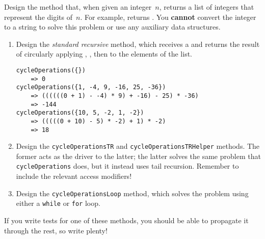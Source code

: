 Design the  method that, when given an integer~$n$, returns a list of integers that represent the digits of~$n$. For example,  returns \ttt{[1, 2, 3]}. You \textbf{cannot} convert the integer to a string to solve this problem or use any auxiliary data structures.

\begin{enumerate}[label=(\alph*)]
    \item Design the \emph{standard recursive}  method, which receives a  and returns the result of circularly applying \ttt{+}, \ttt{-}, then \ttt{*} to the elements of the list.

    \begin{verbatim}
cycleOperations({}) 
    => 0
cycleOperations({1, -4, 9, -16, 25, -36}) 
    => ((((((0 + 1) - -4) * 9) + -16) - 25) * -36) 
    => -144
cycleOperations({10, 5, -2, 1, -2}) 
    => (((((0 + 10) - 5) * -2) + 1) * -2) 
    => 18
    \end{verbatim}  

    \item Design the \texttt{cycleOperationsTR} and \texttt{cycleOperationsTRHelper} methods. The former acts as the driver to the latter; the latter solves the same problem that \texttt{cycleOperations} does, but it instead uses tail recursion. Remember to include the relevant access modifiers!
    
    \item Design the \texttt{cycleOperationsLoop} method, which solves the problem using either a \texttt{while} or \texttt{for} loop.
\end{enumerate}
If you write tests for one of these methods, you should be able to propagate it through the rest, so write plenty!


